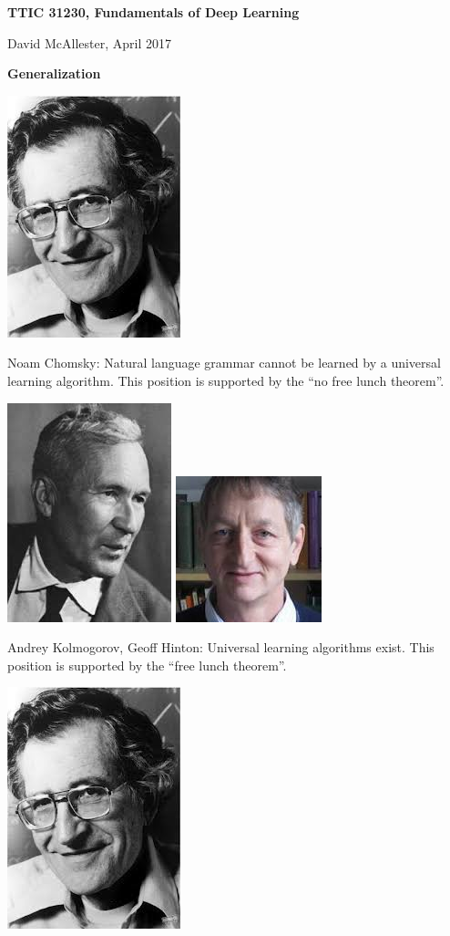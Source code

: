 





{\Huge


\centerline{\bf TTIC 31230, Fundamentals of Deep Learning}
\bigskip
\centerline{David McAllester, April 2017}

\vfill
\centerline{\bf Generalization}
\vfill
\vfill


\includegraphics[width=1.0 in]{../images/Chomsky} \begin{minipage}[b]{8in} Noam Chomsky: 
Natural language grammar cannot be learned by a universal learning algorithm.
This position is supported by the ``no free lunch theorem''.\end{minipage}

\vfill
\includegraphics[height=1.0 in]{../images/Kolmogorov}
\includegraphics[height=1.0 in]{../images/Hinton}
\begin{minipage}[b]{7in}
Andrey Kolmogorov, Geoff Hinton: Universal learning algorithms exist. This position is supported by the ``free lunch theorem''.
\end{minipage}


\includegraphics[width=1.0 in]{../images/Chomsky} 

}
